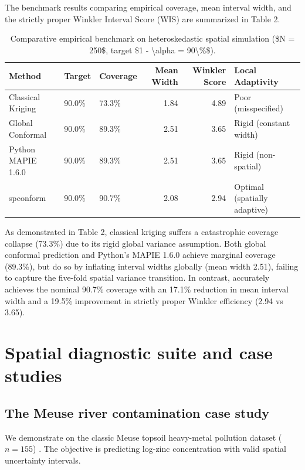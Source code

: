 The benchmark results comparing empirical coverage, mean interval width, and the strictly proper Winkler Interval Score (WIS) \citep{winkler1972decision} are summarized in Table 2.

\begin{table}

\caption{\label{tab:tab-benchmark}Comparative empirical benchmark on heteroskedastic spatial simulation (\$N = 250\$, target \$1 - \textbackslash{}alpha = 90\textbackslash{}\%\$).}
\centering
\begin{tabular}[t]{l|l|l|r|r|l}
\hline
Method & Target & Coverage & Mean Width & Winkler Score & Local Adaptivity\\
\hline
Classical Kriging & 90.0\% & 73.3\% & 1.84 & 4.89 & Poor (misspecified)\\
\hline
Global Conformal & 90.0\% & 89.3\% & 2.51 & 3.65 & Rigid (constant width)\\
\hline
Python MAPIE 1.6.0 & 90.0\% & 89.3\% & 2.51 & 3.65 & Rigid (non-spatial)\\
\hline
spconform & 90.0\% & 90.7\% & 2.08 & 2.94 & Optimal (spatially adaptive)\\
\hline
\end{tabular}
\end{table}

As demonstrated in Table 2, classical kriging suffers a catastrophic coverage collapse (73.3\%) due to its rigid global variance assumption. Both global conformal prediction and Python's MAPIE 1.6.0 achieve marginal coverage (89.3\%), but do so by inflating interval widths globally (mean width 2.51), failing to capture the five-fold spatial variance transition. In contrast,  accurately achieves the nominal 90.7\% coverage with an 17.1\% reduction in mean interval width and a 19.5\% improvement in strictly proper Winkler efficiency (2.94 vs 3.65).

\section{Spatial diagnostic suite and case studies}\label{spatial-diagnostic-suite-and-case-studies}

\subsection{The Meuse river contamination case study}\label{the-meuse-river-contamination-case-study}

We demonstrate  on the classic Meuse topsoil heavy-metal pollution dataset (\(n = 155\)) \citep{pebesma2005classes}. The objective is predicting log-zinc concentration with valid spatial uncertainty intervals.

